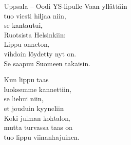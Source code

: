 \begin{song}{Uppsala – Oodi YS-lipulle}
    Vaan yllättäin\\
    tuo viesti hiljaa niin,\\
    se kantautui,\\
    Ruotsista Helsinkiin:\\
    Lippu onneton,\\
    vihdoin löydetty nyt on.\\
    Se saapuu Suomeen takaisin.

    Kun lippu taas\\
    luoksemme kannettiin,\\
    se liehui niin,\\
    et jouduin kyyneliin\\
    Koki julman kohtalon,\\
    mutta turvassa taas on\\
    tuo lippu viinanhajuinen.

\end{song}